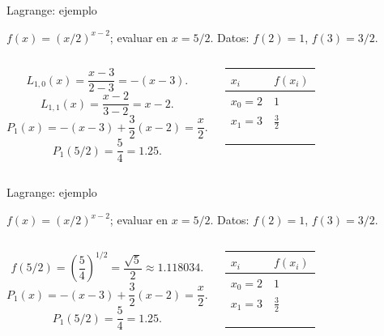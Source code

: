 \documentclass[original_version/main.tex]{subfiles}
\begin{document}
\begin{frame}[t]{Lagrange: ejemplo}
\par\noindent\begin{minipage}[t][7.5mm][t]{\textwidth}\small\strut $f(x)=(x/2)^{x-2}$; evaluar en $x=5/2$. Datos: $f(2)=1$, $f(3)=3/2$.\end{minipage}\par\nointerlineskip
\begin{columns}[T]\small\setlength{\abovedisplayskip}{4pt}\setlength{\belowdisplayskip}{4pt}\small\[L_{1,0}(x)=\frac{x-3}{2-3}=-(x-3).\]
\[L_{1,1}(x)=\frac{x-2}{3-2}=x-2.\]\[P_1(x)=-(x-3)+\frac32(x-2)=\frac{x}{2}.\]
\[P_1(5/2)=\frac54=1.25.\]\begingroup\small\setlength{\tabcolsep}{3pt}\begin{center}\begin{tabular}{|C{.42\textwidth}|C{.42\textwidth}|}\hline
\rule[-2mm]{0pt}{6mm}$x_i$&$f(x_i)$\\\hline
\rule[-2.5mm]{0pt}{6mm}$x_0=2$&$1$\\\hline
\rule[-2.5mm]{0pt}{6mm}$x_1=3$&$\frac{3}{2}$\\\hline
\rule[-2.5mm]{0pt}{6mm}&\\\hline
\rule[-2.5mm]{0pt}{6mm}&\\\hline
\rule[-2.5mm]{0pt}{6mm}&\\\hline
\end{tabular}\end{center}\endgroup\par
\end{columns}
\end{frame}
\begin{frame}[t]{Lagrange: ejemplo}
\par\noindent\begin{minipage}[t][7.5mm][t]{\textwidth}\small\strut $f(x)=(x/2)^{x-2}$; evaluar en $x=5/2$. Datos: $f(2)=1$, $f(3)=3/2$.\end{minipage}\par\nointerlineskip
\begin{columns}[T]\small\setlength{\abovedisplayskip}{4pt}\setlength{\belowdisplayskip}{4pt}\[f(5/2)=\left(\frac54\right)^{1/2}=\frac{\sqrt5}{2}\approx1.118034.\]\[P_1(x)=-(x-3)+\frac32(x-2)=\frac{x}{2}.\]
\[P_1(5/2)=\frac54=1.25.\]\begingroup\small\setlength{\tabcolsep}{3pt}\begin{center}\begin{tabular}{|C{.42\textwidth}|C{.42\textwidth}|}\hline
\rule[-2mm]{0pt}{6mm}$x_i$&$f(x_i)$\\\hline
\rule[-2.5mm]{0pt}{6mm}$x_0=2$&$1$\\\hline
\rule[-2.5mm]{0pt}{6mm}$x_1=3$&$\frac{3}{2}$\\\hline
\rule[-2.5mm]{0pt}{6mm}&\\\hline
\rule[-2.5mm]{0pt}{6mm}&\\\hline
\rule[-2.5mm]{0pt}{6mm}&\\\hline
\end{tabular}\end{center}\endgroup\par
\end{columns}
\end{frame}
\end{document}
